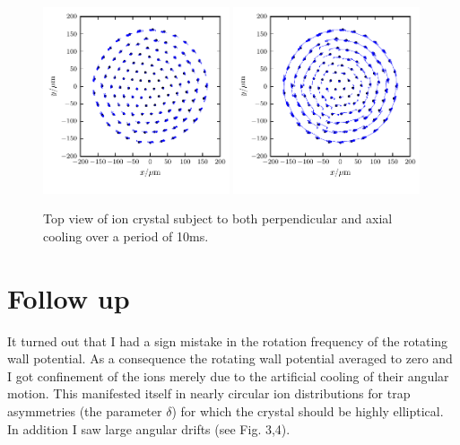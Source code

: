 \documentclass[
  aps,
  reprint,
  twoside,
  showpacs,
  amsmath,
  amssymb,
  floatfix
]{revtex4-1}
\begin{document}
\begin{figure}
\includegraphics[width=0.49\textwidth]{figures/topView44_10875kHzPerpAxial_5ms}
\includegraphics[width=0.49\textwidth]{figures/topView44_10875kHzPerpAxial_6ms}
\caption{Top view of ion crystal subject to both perpendicular and axial
  cooling over a period of 10ms.}
  \label{fig:ionTrajectoriesAxialPerp}
\end{figure}

\section{Follow up}

It turned out that I had a sign mistake in the rotation frequency
of the rotating wall potential.  As a consequence the rotating wall
potential averaged to zero and I got confinement of the ions merely due
to the artificial cooling of their angular motion.  This manifested
itself in nearly circular ion distributions for trap asymmetries (the
    parameter $\delta$) for which the crystal should be highly
elliptical.  In addition I saw large angular drifts (see Fig. 3,4).
\end{document}
